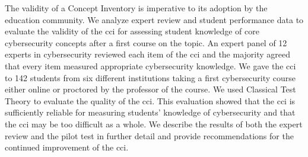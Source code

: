 The validity of a Concept Inventory is imperative to its adoption by the education community. We analyze expert review and student performance data to evaluate the validity of the \gls{cci} for assessing student knowledge of core cybersecurity concepts after a first course on the topic. An expert panel of 12 experts in cybersecurity reviewed each item of the \gls{cci} and the majority agreed that every item measured appropriate cybersecurity knowledge. We gave the \gls{cci} to 142 students from six different institutions taking a first cybersecurity course either online or proctored by the professor of the course. We used Classical Test Theory to evaluate the quality of the \gls{cci}. This evaluation showed that the \gls{cci} is sufficiently reliable for measuring students' knowledge of cybersecurity and that the \gls{cci} may be too difficult as a whole. We describe the results of both the expert review and the pilot test in further detail and provide recommendations for the continued improvement of the \gls{cci}.



